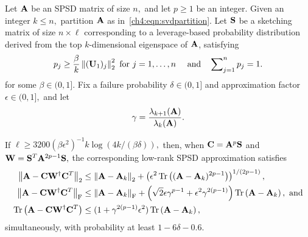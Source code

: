 \begin{thm}
Let $\mathbf{A}$ be an SPSD matrix of size $n,$ and let $p \geq 1$ be an integer. Given an integer $k \leq n,$
partition $\mathbf{A}$ as in~\eqref{ch4:eqn:svdpartition}. 
Let $\mathbf{S}$ be a sketching matrix 
of size $n \times \ell$ corresponding to a leverage-based probability 
distribution derived from the top $k$-dimensional eigenspace of $\mathbf{A}$, 
satisfying
\[
   p_j \geq \frac{\beta}{k}\left\|(\mathbf{U}_1)_j\right\|_2^2 \text{ for $j=1,\ldots,n$ } 
  \quad \text{and} \quad \sum\nolimits_{j=1}^n p_j = 1.
\]
for some $\beta \in (0,1].$ 
Fix a failure probability $\delta \in (0,1]$ and approximation factor $\epsilon \in (0,1],$
and let
\[
 \gamma = \frac{\lambda_{k+1}(\mathbf{A})}{\lambda_k(\mathbf{A})}.
\]

If $\ell \geq 3200 (\beta\epsilon^2)^{-1} k \log(4 k/(\beta \delta)),$ 
then, when $\mathbf{C} = \mathbf{A}^p \mathbf{S}$ and 
$\mathbf{W} = \mathbf{S}^T \mathbf{A}^{2p-1} \mathbf{S},$ the corresponding low-rank SPSD 
approximation satisfies
 \begin{align}
\label{eqn:additive1}
  \left\|\mathbf{A} - \mathbf{C} \mathbf{W}^\dagger \mathbf{C}^T\right\|_2 & \leq 
    \left\|\mathbf{A} - \mathbf{A}_k\right\|_2 + 
    \left( \epsilon^2 \operatorname{Tr}\left((\mathbf{A} - \mathbf{A}_k)^{2p-1}\right) \right)^{1/(2p-1)}  , \\
\label{eqn:additive2}
  \left\|\mathbf{A} - \mathbf{C} \mathbf{W}^\dagger \mathbf{C}^T\right\|_\mathrm{F} & 
  \leq \left\|\mathbf{A} - \mathbf{A}_k\right\|_\mathrm{F} + 
  \left( \sqrt{2} \epsilon \gamma^{p-1}  + 
  \epsilon^2 \gamma^{2(p-1)} \right) \operatorname{Tr}\left(\mathbf{A} - \mathbf{A}_k\right) ,\text{ and} \\
\label{eqn:relative1}
  \operatorname{Tr}\left(\mathbf{A} - \mathbf{C} \mathbf{W}^\dagger \mathbf{C}^T\right) & \leq 
  (1 + \gamma^{2(p-1)}\epsilon^2) \operatorname{Tr}\left(\mathbf{A} - \mathbf{A}_k\right),
\end{align}
simultaneously, with probability at least $1 - 6\delta-0.6.$
\label{ch4:thm:sample-lev}
\end{thm}

